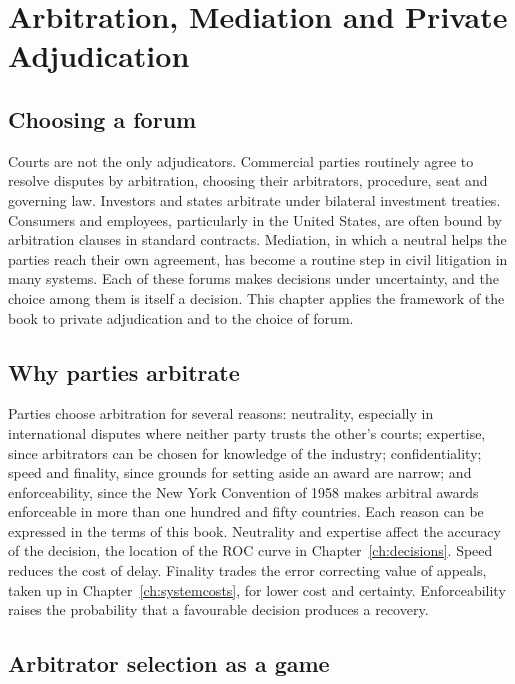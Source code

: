 \chapter{Arbitration, Mediation and Private Adjudication}
\label{ch:arbitration}

\section{Choosing a forum}

Courts are not the only adjudicators. Commercial parties routinely agree to resolve disputes by arbitration, choosing their arbitrators, procedure, seat and governing law. Investors and states arbitrate under bilateral investment treaties. Consumers and employees, particularly in the United States, are often bound by arbitration clauses in standard contracts. Mediation, in which a neutral helps the parties reach their own agreement, has become a routine step in civil litigation in many systems. Each of these forums makes decisions under uncertainty, and the choice among them is itself a decision. This chapter applies the framework of the book to private adjudication and to the choice of forum.

\section{Why parties arbitrate}

Parties choose arbitration for several reasons: neutrality, especially in international disputes where neither party trusts the other's courts; expertise, since arbitrators can be chosen for knowledge of the industry; confidentiality; speed and finality, since grounds for setting aside an award are narrow; and enforceability, since the New York Convention of 1958 makes arbitral awards enforceable in more than one hundred and fifty countries. Each reason can be expressed in the terms of this book. Neutrality and expertise affect the accuracy of the decision, the location of the ROC curve in Chapter~\ref{ch:decisions}. Speed reduces the cost of delay. Finality trades the error correcting value of appeals, taken up in Chapter~\ref{ch:systemcosts}, for lower cost and certainty. Enforceability raises the probability that a favourable decision produces a recovery.

\section{Arbitrator selection as a game}

